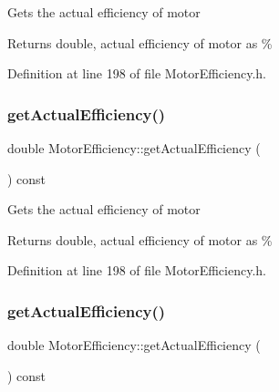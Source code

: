 Gets the actual efficiency of motor

\begin{DoxyReturn}{Returns}
double, actual efficiency of motor as \% 
\end{DoxyReturn}


Definition at line 198 of file Motor\+Efficiency.\+h.

\mbox{\label{class_motor_efficiency_ae40031307b8631cf40df1c4069069dc0}} 
\subsubsection{\texorpdfstring{get\+Actual\+Efficiency()}{getActualEfficiency()}\hspace{0.1cm}{\footnotesize\ttfamily [2/3]}}
{\footnotesize\ttfamily double Motor\+Efficiency\+::get\+Actual\+Efficiency (\begin{DoxyParamCaption}{ }\end{DoxyParamCaption}) const\hspace{0.3cm}{\ttfamily [inline]}}

Gets the actual efficiency of motor

\begin{DoxyReturn}{Returns}
double, actual efficiency of motor as \% 
\end{DoxyReturn}


Definition at line 198 of file Motor\+Efficiency.\+h.

\mbox{\label{class_motor_efficiency_ae40031307b8631cf40df1c4069069dc0}} 
\subsubsection{\texorpdfstring{get\+Actual\+Efficiency()}{getActualEfficiency()}\hspace{0.1cm}{\footnotesize\ttfamily [3/3]}}
{\footnotesize\ttfamily double Motor\+Efficiency\+::get\+Actual\+Efficiency (\begin{DoxyParamCaption}{ }\end{DoxyParamCaption}) const\hspace{0.3cm}{\ttfamily [inline]}}

